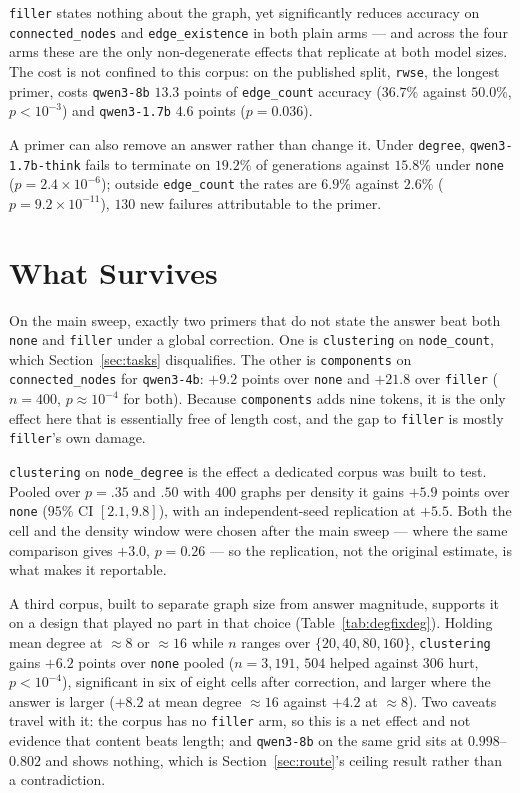 \documentclass[11pt]{article}
\begin{document}
\texttt{filler} states nothing about the graph, yet significantly reduces
accuracy on \texttt{connected\_nodes} and \texttt{edge\_existence} in both
plain arms --- and across the four arms these are the only non-degenerate
effects that replicate at both model sizes. The cost is not confined to this
corpus: on the published split, \texttt{rwse}, the longest primer, costs
\texttt{qwen3-8b} $13.3$ points of \texttt{edge\_count} accuracy
($36.7\%$ against $50.0\%$, $p<10^{-3}$) and \texttt{qwen3-1.7b} $4.6$ points
($p{=}0.036$).

A primer can also remove an answer rather than change it. Under
\texttt{degree}, \texttt{qwen3-1.7b-think} fails to terminate on $19.2\%$ of
generations against $15.8\%$ under \texttt{none} ($p{=}2.4\times10^{-6}$);
outside \texttt{edge\_count} the rates are $6.9\%$ against $2.6\%$
($p{=}9.2\times10^{-11}$), $130$ new failures attributable to the primer.

\section{What Survives}
\label{sec:survives}

On the main sweep, exactly two primers that do not state the answer beat both
\texttt{none} and \texttt{filler} under a global correction. One is
\texttt{clustering} on \texttt{node\_count}, which Section~\ref{sec:tasks}
disqualifies. The other is \texttt{components} on \texttt{connected\_nodes} for
\texttt{qwen3-4b}: $+9.2$ points over \texttt{none} and $+21.8$ over
\texttt{filler} ($n{=}400$, $p\approx10^{-4}$ for both). Because
\texttt{components} adds nine tokens, it is the only effect here that is
essentially free of length cost, and the gap to \texttt{filler} is mostly
\texttt{filler}'s own damage.

\texttt{clustering} on \texttt{node\_degree} is the effect a dedicated corpus
was built to test. Pooled over $p{=}.35$ and $.50$ with $400$ graphs per
density it gains $+5.9$ points over \texttt{none}
($95\%$ CI $[2.1, 9.8]$), with an independent-seed replication at $+5.5$. Both
the cell and the density window were chosen after the main sweep --- where the
same comparison gives $+3.0$, $p{=}0.26$ --- so the replication, not the
original estimate, is what makes it reportable.



A third corpus, built to separate graph size from answer magnitude, supports it
on a design that played no part in that choice (Table~\ref{tab:degfixdeg}).
Holding mean degree at
$\approx 8$ or $\approx 16$ while $n$ ranges over $\{20,40,80,160\}$,
\texttt{clustering} gains $+6.2$ points over \texttt{none} pooled
($n{=}3{,}191$, $504$ helped against $306$ hurt, $p<10^{-4}$), significant in
six of eight cells after correction, and larger where the answer is larger
($+8.2$ at mean degree $\approx 16$ against $+4.2$ at $\approx 8$). Two caveats
travel with it: the corpus has no \texttt{filler} arm, so this is a net effect
and not evidence that content beats length; and \texttt{qwen3-8b} on the same
grid sits at $0.998$--$0.802$ and shows nothing, which is
Section~\ref{sec:route}'s ceiling result rather than a contradiction.
\end{document}
